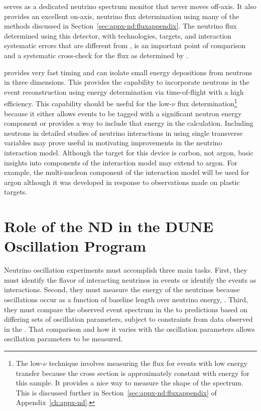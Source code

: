  serves as a dedicated neutrino spectrum monitor that never moves off-axis. %
It also provides an excellent on-axis, neutrino flux determination using many of the methods discussed in Section~\ref{sec:appx-nd:fluxappendix}. 
The neutrino flux determined using this detector, with  %
technologies, targets, and interaction systematic errors that are different from , is an important point of comparison and a systematic cross-check for the flux as determined by .



 provides very fast timing and can isolate small energy depositions from neutrons in three dimensions.  This provides the capability to  incorporate neutrons in the event reconstruction using energy determination via time-of-flight with a high efficiency. This capability should be useful for the low-$\nu$ flux determination\footnote{The low-$\nu$ technique involves measuring the flux for events with low energy transfer because the cross section is approximately constant with energy for this sample.  It provides a nice way to measure the shape of the spectrum.  This is discussed further in Section~\ref{sec:appx-nd:fluxappendix} of Appendix~\ref{ch:appx-nd}.} because it either allows events to be tagged with a significant neutron energy component or provides a way to include that energy in the calculation.  Including neutrons in detailed studies of neutrino interactions in   using single transverse variables may prove useful in motivating improvements in the neutrino interaction model. Although the target for this device is carbon, not argon, basic insights into components of the interaction model may extend to argon.  For example, the multi-nucleon component of the interaction model will be used for argon although it was developed in response to observations made on plastic targets.   



\section{Role of the ND in the DUNE Oscillation Program}
\label{sec:exsum-nd-role}

Neutrino oscillation experiments must accomplish three main tasks. First, they must identify the flavor of interacting neutrinos in  events or identify the events as  interactions. Second, they must measure the energy of the neutrinos because oscillations occur as a function of baseline length over neutrino energy, . Third, they must compare the observed event spectrum in the  to  predictions based on differing sets of oscillation parameters, subject to constraints from data observed in the .  That comparison and how it varies with the oscillation parameters allows oscillation parameters to be measured.

